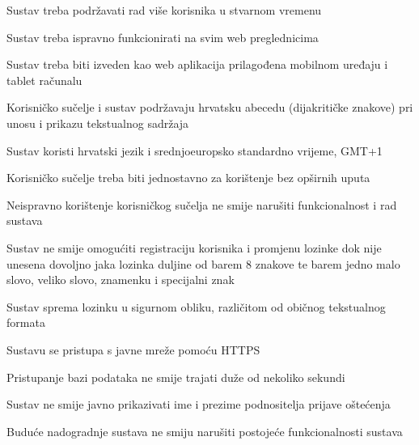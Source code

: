 \begin{packed_enum}
	\item Sustav treba podržavati rad više korisnika u stvarnom vremenu
	\item Sustav treba ispravno funkcionirati na svim web preglednicima
	\item Sustav treba biti izveden kao web aplikacija prilagođena mobilnom uređaju i tablet računalu
	\item Korisničko sučelje i sustav podržavaju hrvatsku abecedu (dijakritičke znakove) pri unosu i prikazu tekstualnog sadržaja
	\item Sustav koristi hrvatski jezik i srednjoeuropsko standardno vrijeme, GMT+1
	\item Korisničko sučelje treba biti jednostavno za korištenje bez opširnih uputa
	\item Neispravno korištenje korisničkog sučelja ne smije narušiti funkcionalnost i rad sustava 
	\item Sustav ne smije omogućiti registraciju korisnika i promjenu lozinke dok nije unesena dovoljno jaka lozinka duljine od barem 8 znakove te barem jedno malo slovo, veliko slovo, znamenku i specijalni znak
	\item Sustav sprema lozinku u sigurnom obliku, različitom od običnog tekstualnog formata
	\item Sustavu se pristupa s javne mreže pomoću HTTPS
	\item Pristupanje bazi podataka ne smije trajati duže od nekoliko sekundi
	\item Sustav ne smije javno prikazivati ime i prezime podnositelja prijave oštećenja
	\item Buduće nadogradnje sustava ne smiju narušiti postojeće funkcionalnosti sustava
\end{packed_enum}

